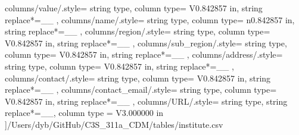 \begin{landscape}
    columns/value/.style={
            string type, 
            column type= V{0.842857 in}, 
            string replace*={_}{\_}
        },
    columns/name/.style={
            string type, 
            column type= n{0.842857 in}, 
            string replace*={_}{\_}
        },
    columns/region/.style={
            string type, 
            column type= V{0.842857 in}, 
            string replace*={_}{\_}
        },
    columns/sub_region/.style={
            string type, 
            column type= V{0.842857 in}, 
            string replace*={_}{\_}
        },
    columns/address/.style={
            string type, 
            column type= V{0.842857 in}, 
            string replace*={_}{\_}
        },
    columns/contact/.style={
            string type, 
            column type= V{0.842857 in}, 
            string replace*={_}{\_}
        },
    columns/contact_email/.style={
            string type, 
            column type= V{0.842857 in}, 
            string replace*={_}{\_}
        },
    columns/URL/.style={
            string type, 
            string replace*={_}{\_},
            column type = V{3.000000 in}
        }
    ]{/Users/dyb/GitHub/C3S_311a_CDM/tables/institute.csv}
\end{landscape}
